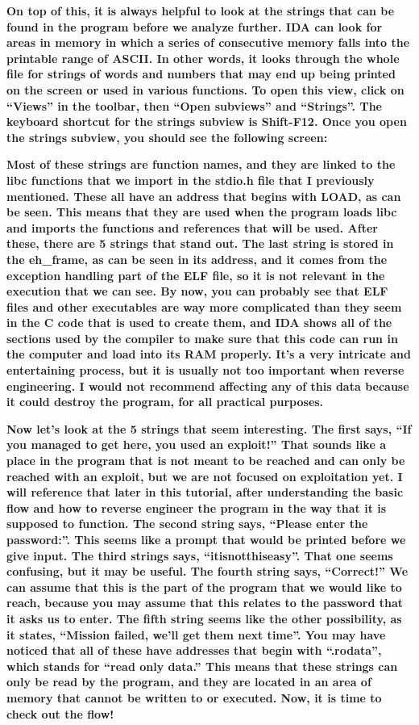 \documentclass[letterpaper]{article}
\newcommand{\sitfig}[3]{
\begin{figure}[H]
\centering
\makebox[\textwidth][c]{
#2
}
\label{#1}
\end{figure}
}
\newcommand{\sitgfx}[4][scale=1.0]{
\sitfig{#3}{\texttt{[image: \#2]}}{#4}
}
\begin{document}
\textbf{On top of this, it is always helpful to look at the strings that can be found in the program before we analyze
further. IDA can look for areas in memory in which a series of consecutive memory falls into the printable range of
ASCII. In other words, it looks through the whole file for strings of words and numbers that may end up being printed
on the screen or used in various functions. To open this view, click on ``Views'' in the toolbar, then ``Open
subviews'' and ``Strings''. The keyboard shortcut for the strings subview is Shift-F12. Once you open the strings
subview, you should see the following screen:}

  
\sitgfx[width=6.1252in,height=3.8335in]{FINALWORKINGDOCFORMERLYPRECURSOR-img046.png}{fig:unk}{TODO CAPTION}
 \textbf{Most of these strings are function names, and they are linked to the libc functions that we import in the
stdio.h file that I previously mentioned. These all have an address that begins with LOAD, as can be seen. This means
that they are used when the program loads libc and imports the functions and references that will be used. After these,
there are 5 strings that stand out. The last string is stored in the eh\_frame, as can be seen in its address, and it
comes from the exception handling part of the ELF file, so it is not relevant in the execution that we can see. By now,
you can probably see that ELF files and other executables are way more complicated than they seem in the C code that is
used to create them, and IDA shows all of the sections used by the compiler to make sure that this code can run in the
computer and load into its RAM properly. It's a very intricate and entertaining process, but it is usually not too
important when reverse engineering. I would not recommend affecting any of this data because it could destroy the
program, for all practical purposes.}

\textbf{Now let's look at the 5 strings that seem interesting. The first says, ``If you managed to get here, you used an
exploit!'' That sounds like a place in the program that is not meant to be reached and can only be reached with an
exploit, but we are not focused on exploitation yet. I will reference that later in this tutorial, after understanding
the basic flow and how to reverse engineer the program in the way that it is supposed to function. The second string
says, ``Please enter the password:''. This seems like a prompt that would be printed before we give input. The third
strings says, ``itisnotthiseasy''. That one seems confusing, but it may be useful. The fourth string says, ``Correct!''
We can assume that this is the part of the program that we would like to reach, because you may assume that this
relates to the password that it asks us to enter. The fifth string seems like the other possibility, as it states,
``Mission failed, we'll get them next time''. You may have noticed that all of these have addresses that begin with
``.rodata'', which stands for ``read only data.'' This means that these strings can only be read by the program, and
they are located in an area of memory that cannot be written to or executed. Now, it is time to check out the flow!}
\end{document}
